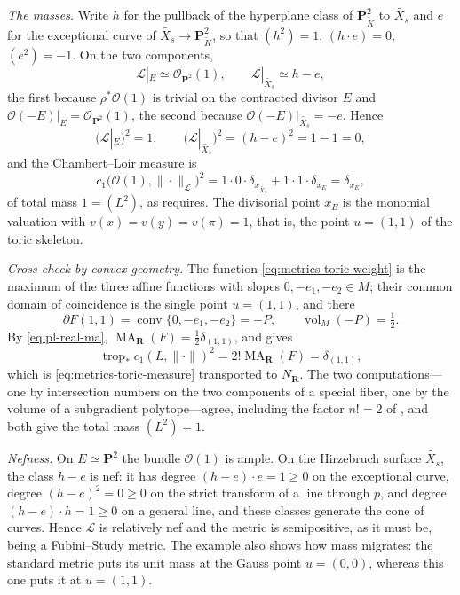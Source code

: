 \begin{example}
\emph{The masses.} Write $h$ for the pullback of the hyperplane class of
$\mathbf P^2_{\widetilde K}$ to $\widetilde{X_s}$ and $e$ for the
exceptional curve of $\widetilde{X_s}\to\mathbf P^2_{\widetilde K}$, so
that $(h^2)=1$, $(h\cdot e)=0$, $(e^2)=-1$. On the two components,
\[
 \mathcal L|_{E}\simeq\mathcal O_{\mathbf P^2}(1),
 \qquad
 \mathcal L|_{\widetilde{X_s}}\simeq h-e,
\]
the first because $\rho^*\mathcal O(1)$ is trivial on the contracted
divisor $E$ and $\mathcal O(-E)|_E=\mathcal O_{\mathbf P^2}(1)$, the
second because $\mathcal O(-E)|_{\widetilde{X_s}}=-e$. Hence
\[
 \bigl(\mathcal L|_{E}\bigr)^2=1,
 \qquad
 \bigl(\mathcal L|_{\widetilde{X_s}}\bigr)^2=(h-e)^2=1-1=0,
\]
and the Chambert--Loir measure is
\begin{equation}
\label{eq:metrics-toric-measure}
 c_1\bigl(\mathcal O(1),\|\cdot\|_{\mathcal L}\bigr)^2
 =1\cdot0\cdot\delta_{x_{\widetilde{X_s}}}+1\cdot1\cdot\delta_{x_E}
 =\delta_{x_E},
\end{equation}
of total mass $1=(L^2)$, as  requires. The
divisorial point $x_E$ is the monomial valuation with
$v(x)=v(y)=v(\pi)=1$, that is, the point $u=(1,1)$ of the toric
skeleton.

\emph{Cross-check by convex geometry.} The function
\eqref{eq:metrics-toric-weight} is the maximum of the three affine functions
with slopes $0,-e_1,-e_2\in M$; their common domain of coincidence is the
single point $u=(1,1)$, and there
\[
 \partial F(1,1)=\operatorname{conv}\{0,-e_1,-e_2\}=-P,
 \qquad
 \operatorname{vol}_M(-P)=\tfrac12 .
\]
By \eqref{eq:pl-real-ma}, $\operatorname{MA}_{\mathbf R}(F)
=\tfrac12\delta_{(1,1)}$, and
 gives
\[
 \operatorname{trop}_*c_1(L,\|\cdot\|)^2
 =2!\operatorname{MA}_{\mathbf R}(F)
 =\delta_{(1,1)},
\]
which is \eqref{eq:metrics-toric-measure} transported to
$N_{\mathbf R}$. The two computations---one by intersection numbers on the
two components of a special fiber, one by the volume of a subgradient
polytope---agree, including the factor $n!=2$ of
, and both give the total mass
$(L^2)=1$.

\emph{Nefness.} On $E\simeq\mathbf P^2$ the bundle $\mathcal O(1)$ is
ample. On the Hirzebruch surface $\widetilde{X_s}$, the class $h-e$ is
nef: it has degree $(h-e)\cdot e=1\ge0$ on the exceptional curve,
degree $(h-e)^2=0\ge0$ on the strict transform of a line through $p$,
and degree $(h-e)\cdot h=1\ge0$ on a general line, and these classes
generate the cone of curves. Hence $\mathcal L$ is relatively nef and the
metric is semipositive, as it must be, being a Fubini--Study metric. The
example also shows how mass migrates: the standard metric puts its unit mass
at the Gauss point $u=(0,0)$, whereas this one puts it at $u=(1,1)$.
\end{example}

